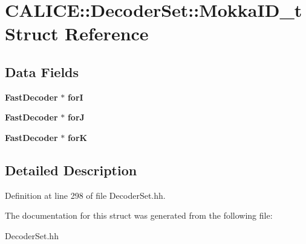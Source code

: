 \section{CALICE::DecoderSet::MokkaID\_\-t Struct Reference}
\label{structCALICE_1_1DecoderSet_1_1MokkaID__t}
\subsection*{Data Fields}
\begin{DoxyCompactItemize}
\item 
{\bf FastDecoder} $\ast$ {\bfseries forI}\label{structCALICE_1_1DecoderSet_1_1MokkaID__t_a4f0b95ad71486efa86b4cff6fad0a1fd}

\item 
{\bf FastDecoder} $\ast$ {\bfseries forJ}\label{structCALICE_1_1DecoderSet_1_1MokkaID__t_a0e74909c84cf269f74f3e39427136812}

\item 
{\bf FastDecoder} $\ast$ {\bfseries forK}\label{structCALICE_1_1DecoderSet_1_1MokkaID__t_aaf7d5981f495355e40c1dc75b0627fa5}

\end{DoxyCompactItemize}


\subsection{Detailed Description}


Definition at line 298 of file DecoderSet.hh.

The documentation for this struct was generated from the following file:\begin{DoxyCompactItemize}
\item 
DecoderSet.hh\end{DoxyCompactItemize}
